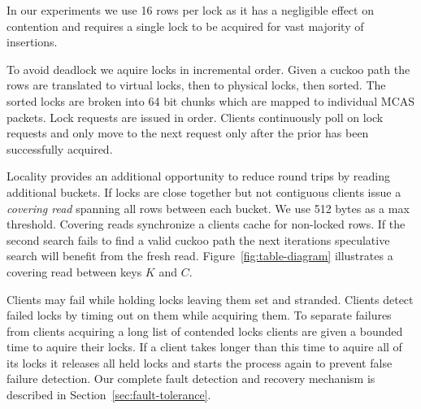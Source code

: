 In our
experiments we use 16 rows per lock as it has a negligible
effect on contention and requires a single lock to be
acquired for vast majority of insertions.


To avoid deadlock we aquire locks in incremental order.
Given a cuckoo path the rows are translated to virtual
locks, then to physical locks, then sorted. The sorted
locks are broken into 64 bit chunks which are mapped to
individual MCAS packets.  Lock requests are issued in order.
Clients continuously poll on lock requests and only move to
the next request only after the prior has been successfully
acquired.

Locality provides an additional opportunity to reduce round
trips by reading additional buckets. If locks are close
together but not contiguous clients issue a \textit{covering
read} spanning all rows between each bucket. We use 512
bytes as a max threshold. Covering reads synchronize a
clients cache for non-locked rows. If the second search
fails to find a valid cuckoo path the next iterations
speculative search will benefit from the fresh read.
Figure~\ref{fig:table-diagram} illustrates a covering read
between keys $K$ and $C$.


Clients may fail while holding locks leaving them set and
stranded. Clients detect failed locks by timing out on them
while acquiring them. To separate failures from clients
acquiring a long list of contended locks clients are given a
bounded time to aquire their locks. If a client takes longer
than this time to aquire all of its locks it releases all
held locks and starts the process again to prevent false
failure detection. Our complete fault detection and recovery
mechanism is described in Section~\ref{sec:fault-tolerance}.

